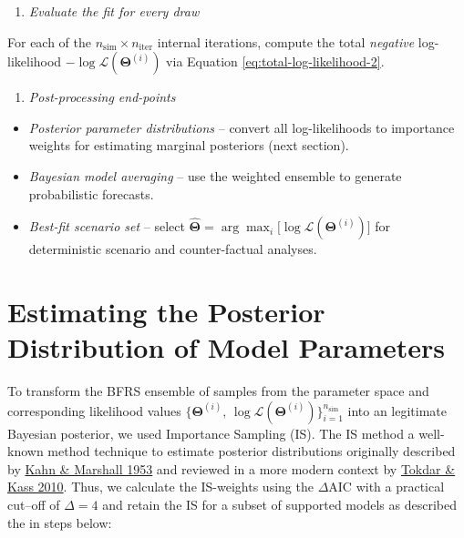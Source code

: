 \documentclass[
]{book}
\providecommand{\tightlist}{%
  \setlength{\itemsep}{0pt}\setlength{\parskip}{0pt}}
\begin{document}
\begin{enumerate}
\def\labelenumi{\arabic{enumi}.}
\setcounter{enumi}{2}
\tightlist
\item
  \emph{Evaluate the fit for every draw}
\end{enumerate}

For each of the \(n_{\text{sim}} \times n_{\text{iter}}\) internal iterations, compute the total \emph{negative} log-likelihood \(-\log\mathcal{L}(\boldsymbol{\Theta}^{(i)})\) via Equation \eqref{eq:total-log-likelihood-2}.

\begin{enumerate}
\def\labelenumi{\arabic{enumi}.}
\setcounter{enumi}{3}
\tightlist
\item
  \emph{Post-processing end-points}
\end{enumerate}

\begin{itemize}
\tightlist
\item
  \emph{Posterior parameter distributions} -- convert all log-likelihoods to importance weights for estimating marginal posteriors (next section).\\
\item
  \emph{Bayesian model averaging} -- use the weighted ensemble to generate probabilistic forecasts.\\
\item
  \emph{Best-fit scenario set} -- select \(\hat{\boldsymbol{\Theta}} = \arg\max_i\bigl[\log\mathcal{L}(\boldsymbol{\Theta}^{(i)})\bigr]\) for deterministic scenario and counter-factual analyses.
\end{itemize}

\section{Estimating the Posterior Distribution of Model Parameters}\label{estimating-the-posterior-distribution-of-model-parameters}

To transform the BFRS ensemble of samples from the parameter space and corresponding likelihood values
\(\bigl\{\boldsymbol{\Theta}^{(i)},\,\log\mathcal{L}(\boldsymbol{\Theta}^{(i)})\bigr\}_{i=1}^{n_{\text{sim}}}\) into an legitimate Bayesian posterior, we used Importance Sampling (IS). The IS method a well-known method technique to estimate posterior distributions originally described by \href{https://pubsonline.informs.org/doi/10.1287/opre.1.5.263}{Kahn \& Marshall 1953} and reviewed in a more modern context by \href{https://doi.org/10.1002/wics.56}{Tokdar \& Kass 2010}. Thus, we calculate the IS-weights using the \(\Delta \text{AIC}\) with a practical cut--off of \(\Delta=4\) and retain the IS for a subset of supported models as described the in steps below:
\end{document}
